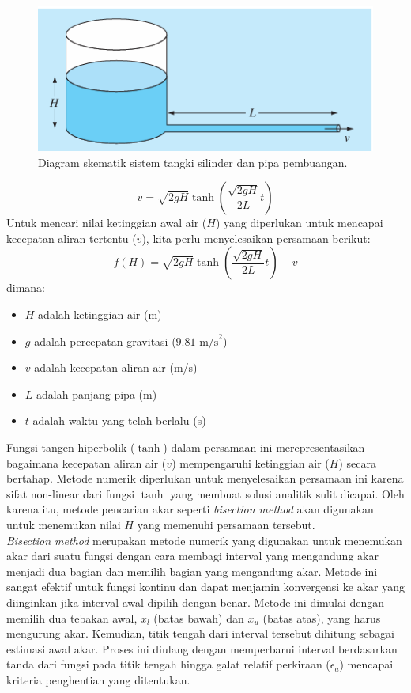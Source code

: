 \documentclass[conference]{IEEEtran}
\begin{document}
\begin{figure}[htbp]
  \centering
  \includegraphics[width=\columnwidth]{src/5.15.png}
  \caption{Diagram skematik sistem tangki silinder dan pipa pembuangan.}
  \label{fig:sistem_tangki}
\end{figure}

\begin{equation}
v = \sqrt{2gH} \tanh\left(\frac{\sqrt{2gH}}{2L}t\right)
\label{eq:kecepatan_air}
\end{equation}
Untuk mencari nilai ketinggian awal air ($H$) yang diperlukan untuk mencapai kecepatan aliran tertentu ($v$), kita perlu menyelesaikan persamaan berikut:
\begin{equation}
    f(H) = \sqrt{2gH} \tanh\left(\frac{\sqrt{2gH}}{2L}t\right) - v
    \label{eq:bernoulli_inverse}
\end{equation}
dimana:
\begin{itemize}
    \item $H$ adalah ketinggian air (m) 
    \item $g$ adalah percepatan gravitasi ($9.81 \text{ m/s}^2$) 
    \item $v$ adalah kecepatan aliran air (m/s) 
    \item $L$ adalah panjang pipa (m) 
    \item $t$ adalah waktu yang telah berlalu (s) 
\end{itemize}
Fungsi tangen hiperbolik ($\tanh$) dalam persamaan ini merepresentasikan bagaimana kecepatan aliran air ($v$) mempengaruhi ketinggian air ($H$) secara bertahap. Metode numerik diperlukan untuk menyelesaikan persamaan ini karena sifat non-linear dari fungsi $\tanh$ yang membuat solusi analitik sulit dicapai. Oleh karena itu, metode pencarian akar seperti \textit{bisection method} akan digunakan untuk menemukan nilai $H$ yang memenuhi persamaan tersebut. \\

\textit{Bisection method} merupakan metode numerik yang digunakan untuk menemukan akar dari suatu fungsi dengan cara membagi interval yang mengandung akar menjadi dua bagian dan memilih bagian yang mengandung akar. Metode ini sangat efektif untuk fungsi kontinu dan dapat menjamin konvergensi ke akar yang diinginkan jika interval awal dipilih dengan benar. Metode ini dimulai dengan memilih dua tebakan awal, $x_l$ (batas bawah) dan $x_u$ (batas atas), yang harus mengurung akar. Kemudian, titik tengah dari interval tersebut dihitung sebagai estimasi awal akar. Proses ini diulang dengan memperbarui interval berdasarkan tanda dari fungsi pada titik tengah hingga galat relatif perkiraan ($\epsilon_a$) mencapai kriteria penghentian yang ditentukan.
\end{document}
